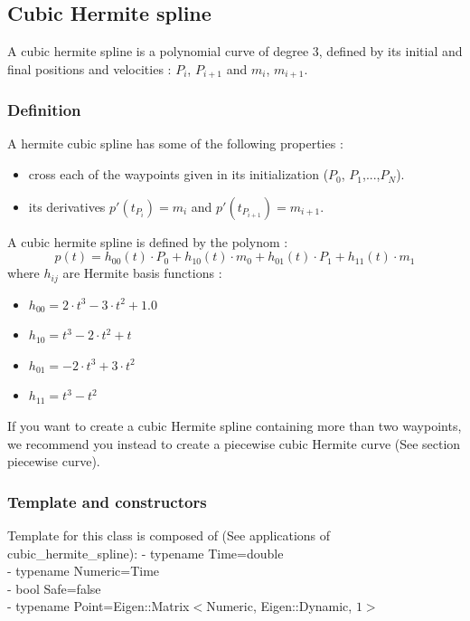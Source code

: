 \documentclass{article}
\begin{document}
\subsection{Cubic Hermite spline}
    A cubic hermite spline is a polynomial curve of degree 3, defined by its initial and final positions and velocities : $P_i$, $P_{i+1}$ and $m_i$, $m_{i+1}$.\\
    
    \subsubsection{Definition}
    
    A hermite cubic spline has some of the following properties :
    \begin{itemize}
        \item cross each of the waypoints given in its initialization ($P_0$, $P_1$,...,$P_N$).
        \item its derivatives $p'(t_{P_i}) = m_i$ and $p'(t_{P_{i+1}}) = m_{i+1}$.
    \end{itemize}
    A cubic hermite spline is defined by the polynom :
    \begin{equation}\label{eq:hermiteSpline}
    p(t)=h_{00}(t)\cdot P_0 + h_{10}(t) \cdot m_0 + h_{01}(t) \cdot P_1 + h_{11}(t) \cdot m_1
    \end{equation}
    where $h_{ij}$ are Hermite basis functions :
    \begin{itemize}
        \item $h_{00} = 2 \cdot t^3 - 3 \cdot t^2 + 1.0$
        \item $h_{10} = t^3 - 2 \cdot t^2 + t$
        \item $h_{01} = -2 \cdot t^3 + 3 \cdot t^2$
        \item $h_{11} = t^3 - t^2$
    \end{itemize}
    
    If you want to create a cubic Hermite spline containing more than two waypoints,
    we recommend you instead to create a piecewise cubic Hermite curve (See section piecewise curve).

    \subsubsection{Template and constructors}
    
    Template for this class is composed of (See applications of cubic\_hermite\_spline):
    - typename Time=double\\
    - typename Numeric=Time\\
    - bool Safe=false\\
    - typename Point=Eigen::Matrix$<$Numeric, Eigen::Dynamic, $1>$\\
    
\end{document}
